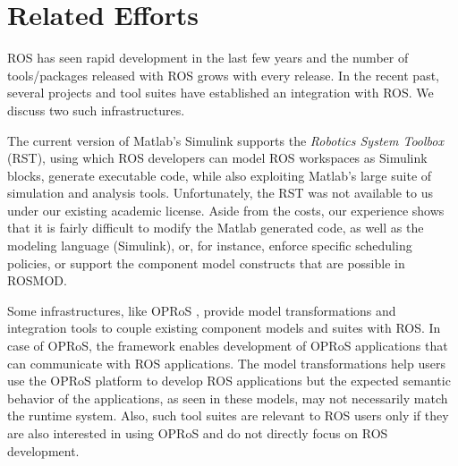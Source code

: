 \section{Related Efforts}
\label{sec:Related_Research}

ROS has seen rapid development in the last few years and the number of tools/packages released with ROS grows with every release. In the recent past, several projects and tool suites have established an integration with ROS. We discuss two such infrastructures.

The current version of Matlab's Simulink \cite{Simulink} supports the \emph{Robotics System Toolbox} \cite{Simulink_robotics_toolbox} (RST), using which ROS developers can model ROS workspaces as Simulink blocks, generate executable code, while also exploiting Matlab's large suite of simulation and analysis tools. Unfortunately, the RST was not available to us under our existing academic license. Aside from the costs, our experience shows that it is fairly difficult to modify the Matlab generated code, as well as the modeling language (Simulink), or, for instance, enforce specific scheduling policies, or support the component model constructs that are possible in ROSMOD. 

Some infrastructures, like OPRoS \cite{OPRoS}, provide model transformations and integration tools to couple existing component models and suites with ROS. In case of OPRoS, the framework enables development of OPRoS applications that can communicate with ROS applications. The model transformations help users use the OPRoS platform to develop ROS applications but the expected semantic behavior of the applications, as seen in these models, may not necessarily match the runtime system. Also, such tool suites are relevant to ROS users only if they are also interested in using OPRoS and do not directly focus on ROS development.
